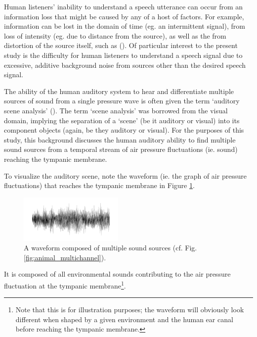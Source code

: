 Human listeners' inability to understand a speech utterance can occur from an information loss that might be caused by any of a host of factors.  For example, information can be lost in the domain of time (eg. an intermittent signal), from loss of intensity (eg. due to distance from the source), as well as the from distortion of the source itself, such as \DIFdelbegin {}\DIFdelend \DIFaddbegin {}\DIFaddend (\cite{mattys:12}).  Of particular interest to the present study is the difficulty for human listeners to understand a speech signal due to excessive, additive background noise from sources other than the desired speech signal.

The ability of the human auditory system to hear and differentiate multiple sources of sound from a single pressure wave is often given the term `auditory scene analysis' (\cite{bregman:94}).  The term `scene analysis' was borrowed from the visual domain, implying the separation of a `scene' (be it auditory or visual) into its component objects (again, be they auditory or visual). For the purposes of this study, this background discusses the human auditory ability to find multiple sound sources from a temporal stream of air pressure fluctuations (ie. sound) reaching the tympanic membrane.

To visualize the auditory scene, note the waveform (ie. the graph of air pressure fluctuations) that reaches the tympanic membrane in Figure \ref{fig:animal_singlechannel}.  
%
\begin{figure}
\centering
  \includegraphics[width=0.45\textwidth]{figure/single-channel-animals.png}
  \caption{A waveform composed of multiple sound sources (cf. Fig. \ref{fig:animal_multichannel}).}
  \label{fig:animal_singlechannel}
\end{figure}
%
It is composed of all environmental sounds contributing to the air pressure fluctuation at the tympanic membrane\footnote{Note that this is for illustration purposes; the waveform will obviously look different when shaped by a given environment and the human ear canal before reaching the tympanic membrane.}.

